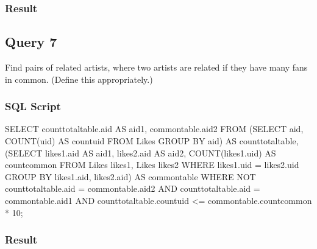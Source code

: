 \documentclass[letter, 12pt]{report}
\begin{document}
	\subsubsection{Result}
	
	\subsection{Query 7}
	Find pairs of related artists, where two artists are related if they have many fans in common. (Define
	this appropriately.)
	\subsubsection{SQL Script}
	\begin{spverbatim}
		SELECT counttotaltable.aid AS aid1, commontable.aid2
		FROM (SELECT aid, COUNT(uid) AS countuid FROM Likes GROUP BY aid) AS counttotaltable,
		(SELECT likes1.aid AS aid1, likes2.aid AS aid2, COUNT(likes1.uid) AS countcommon
		FROM Likes likes1, Likes likes2
		WHERE likes1.uid = likes2.uid
		GROUP BY likes1.aid, likes2.aid) AS commontable
		WHERE NOT counttotaltable.aid = commontable.aid2
		AND counttotaltable.aid = commontable.aid1
		AND counttotaltable.countuid <= commontable.countcommon * 10;
	\end{spverbatim}
	\subsubsection{Result}
\end{document}
